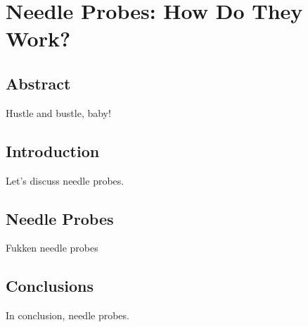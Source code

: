 \chapter{Needle Probes: How Do They Work?}
\label{sec:ch1}

\bigskip

\section*{Abstract}
\label{sec:ch1_abstract}

Hustle and bustle, baby!

\section{Introduction}
\label{sec:ch1_introduction}

Let's discuss needle probes.

\section{Needle Probes}
\label{sec:ch1_needle_probes}

Fukken needle probes

\section{Conclusions}
\label{sec:ch1_conclusions}

In conclusion, needle probes.
